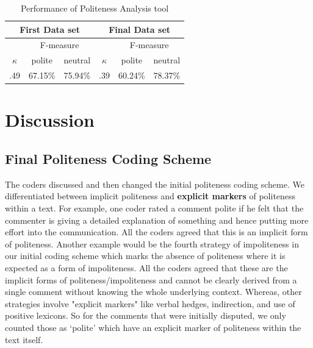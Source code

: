 \vspace{3mm}
\noindent{}

\begin{table}
\centering
\caption{Performance of Politeness Analysis tool}
\label{polresult}
\begin{tabular}{|c|c|c|c|c|c|}
\hline
\multicolumn{3}{|c|}{ First Data set }& \multicolumn{3}{c|}{ Final Data set } \\
\hline
 & \multicolumn{2}{c|}{ F-measure } & & \multicolumn{2}{c|}{ F-measure } \\
 \hline
$\kappa$ & polite & neutral & $\kappa$ & polite & neutral \\
\hline
.49 & 67.15\% & 75.94\% & .39 & 60.24\% & 78.37\%\\
\hline
\end{tabular}
\end{table}

\section{Discussion}
\subsection{Final Politeness Coding Scheme} \label{finalpolscheme}

The coders discussed and then changed 
the initial politeness coding scheme. 
We differentiated between implicit politeness 
and \textbf{explicit markers} of politeness 
within a text. 
For example, one coder rated a comment polite 
if he felt that the commenter is giving a detailed explanation 
of something and 
hence putting more effort into the communication. 
All the coders agreed that 
this is an implicit form of politeness. 
Another example would be the fourth strategy of impoliteness 
in our initial coding scheme which 
marks the absence of politeness where it is expected 
as a form of impoliteness. 
All the coders agreed that 
these are the implicit forms of politeness/impoliteness 
and cannot be clearly derived from a single comment 
without knowing the whole underlying context. 
Whereas, other strategies involve "explicit markers" 
like verbal hedges, indirection, and use of positive lexicons. 
So for the comments that were initially disputed, 
we only counted those as `polite' 
which have an explicit marker of politeness 
within the text itself.

